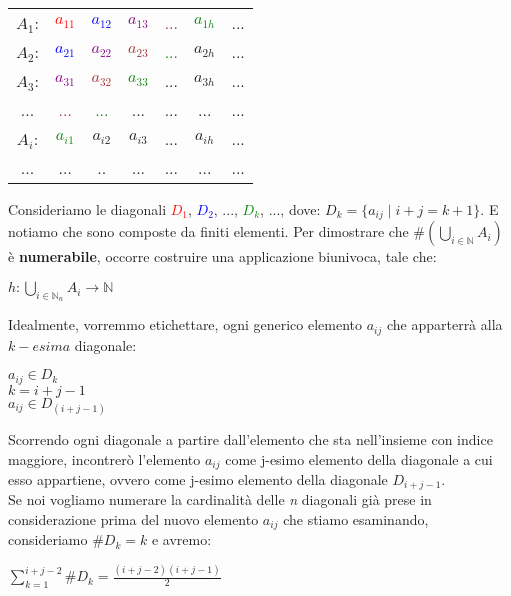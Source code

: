 \begin{center}
    \begin{tabular}{ccccccc}
        $A_1$: & \textcolor{red}{$a_{11}$} & \textcolor{blue}{$a_{12}$} & \textcolor{purple}{$a_{13}$} & \textcolor{brown}{...} & \textcolor{green}{$a_{1h}$} & ... \\
        $A_2$: & \textcolor{blue}{$a_{21}$} & \textcolor{purple}{$a_{22}$} & \textcolor{brown}{$a_{23}$} & \textcolor{green}{...} & $a_{2h}$ & ... \\
        $A_3$: & \textcolor{purple}{$a_{31}$} & \textcolor{brown}{$a_{32}$} & \textcolor{green}{$a_{33}$} & ... & $a_{3h}$ & ... \\
        ... & \textcolor{brown}{...} & \textcolor{green}{...} & ... & ... & ... & ... \\
        $A_i$: & \textcolor{green}{$a_{i1}$} & $a_{i2}$ & $a_{i3}$ & ... & $a_{ih}$ & ... \\
        ... & ... & .. & ... & ... & ... & ... \\
    \end{tabular}
\end{center}
Consideriamo le diagonali \textcolor{red}{$D_1$}, \textcolor{blue}{$D_2$}, ..., \textcolor{green}{$D_k$}, ..., dove: $D_k = \{a_{ij} \; | \; i + j = k + 1\}$. E notiamo che sono composte da finiti elementi. Per dimostrare che $\#(\bigcup_{i \in \mathbb{N}}A_i)$ è \textbf{numerabile}, occorre costruire una applicazione biunivoca, tale che:
\begin{center}
    $h : \bigcup_{i \in \mathbb{N}_n} A_i \rightarrow \mathbb{N}$
\end{center}
Idealmente, vorremmo etichettare, ogni generico elemento $a_{ij}$ che apparterrà alla $k-esima$ diagonale:
\begin{center}
    $a_{ij} \in D_{k}$ \\
    $k = i + j - 1$ \\
    $a_{ij} \in D_{(i + j - 1)}$
\end{center}
Scorrendo ogni diagonale a partire dall'elemento che sta nell'insieme con indice maggiore, incontrerò l'elemento $a_{ij}$ come j-esimo elemento della diagonale a cui esso appartiene, ovvero come j-esimo elemento della diagonale $D_{i+j-1}$. \\
Se noi vogliamo numerare la cardinalità delle \textit{n} diagonali già prese in considerazione prima del nuovo elemento $a_{ij}$ che stiamo esaminando, consideriamo $\#D_k = k$ e avremo:
\begin{center}
    $\sum_{k=1}^{i+j-2}\#D_k = \frac{(i + j - 2)(i + j - 1)}{2}$
\end{center}
